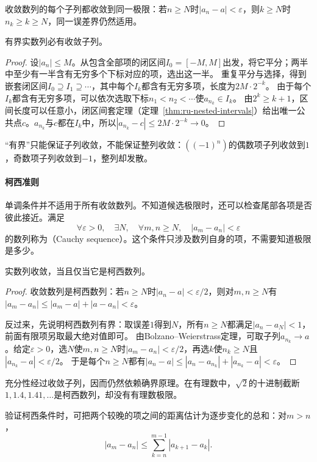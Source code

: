 收敛数列的每个子列都收敛到同一极限：若$n\geq N$时$|a_n-a|<\varepsilon$，则$k\geq N$时$n_k\geq k\geq N$，同一误差界仍然适用。
\begin{theorem}
\label{thm:analysis-bounded-subsequence}
有界实数列必有收敛子列。
\end{theorem}
\begin{proof}
设$|a_n|\leq M$。从包含全部项的闭区间$I_0=[-M,M]$出发，将它平分；两半中至少有一半含有无穷多个下标对应的项，选出这一半。
重复平分与选择，得到嵌套闭区间$I_0\supseteq I_1\supseteq\cdots$，其中每个$I_k$都含有无穷多项，长度为$2M\cdot2^{-k}$。
由于每个$I_k$都含有无穷多项，可以依次选取下标$n_1<n_2<\cdots$使$a_{n_k}\in I_k$。
由$2^k\geq k+1$，区间长度可以任意小，闭区间套定理（定理~\ref{thm:ru-nested-intervals}）给出唯一公共点$c$。$a_{n_k}$与$c$都在$I_k$中，所以$|a_{n_k}-c|\leq2M\cdot2^{-k}\to0$。
\end{proof}
“有界”只能保证子列收敛，不能保证整列收敛：$((-1)^n)$的偶数项子列收敛到$1$，奇数项子列收敛到$-1$，整列却发散。

\paragraph{柯西准则}
单调条件并不适用于所有收敛数列。不知道候选极限时，还可以检查尾部各项是否彼此接近。满足
\[
 \forall\varepsilon>0,\quad\exists N,\quad\forall m,n\geq N,\quad|a_m-a_n|<\varepsilon
\]
的数列称为（Cauchy sequence）。这个条件只涉及数列自身的项，不需要知道极限是多少。
\begin{theorem}[柯西收敛准则]
\label{thm:analysis-cauchy-convergence}
实数列收敛，当且仅当它是柯西数列。
\end{theorem}
\begin{proof}
收敛数列是柯西数列：若$n\geq N$时$|a_n-a|<\varepsilon/2$，则对$m,n\geq N$有$|a_m-a_n|\leq|a_m-a|+|a-a_n|<\varepsilon$。

反过来，先说明柯西数列有界：取误差$1$得到$N$，所有$n\geq N$都满足$|a_n-a_N|<1$，前面有限项另取最大绝对值即可。
由Bolzano--Weierstrass定理，可取子列$a_{n_k}\to a$。给定$\varepsilon>0$，选$N$使$m,n\geq N$时$|a_m-a_n|<\varepsilon/2$，再选$k$使$n_k\geq N$且$|a_{n_k}-a|<\varepsilon/2$。
于是每个$n\geq N$都有$|a_n-a|\leq|a_n-a_{n_k}|+|a_{n_k}-a|<\varepsilon$。
\end{proof}
充分性经过收敛子列，因而仍然依赖确界原理。在有理数中，$\sqrt2$的十进制截断$1,1.4,1.41,\ldots$是柯西数列，却没有有理数极限。

验证柯西条件时，可把两个较晚的项之间的距离估计为逐步变化的总和：对$m>n$，
\[
 |a_m-a_n|\leq\sum_{k=n}^{m-1}|a_{k+1}-a_k|.
\]

